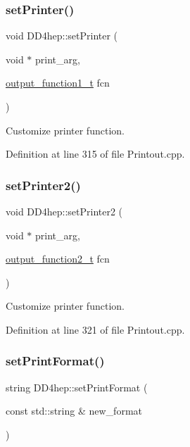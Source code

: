 \subsubsection{\texorpdfstring{set\+Printer()}{setPrinter()}}
{\footnotesize\ttfamily void D\+D4hep\+::set\+Printer (\begin{DoxyParamCaption}\item[{void $\ast$}]{print\+\_\+arg,  }\item[{\hyperlink{namespace_d_d4hep_ae0b064bdf91daefc2e45293797f6780b}{output\+\_\+function1\+\_\+t}}]{fcn }\end{DoxyParamCaption})}



Customize printer function. 



Definition at line 315 of file Printout.\+cpp.

\hypertarget{namespace_d_d4hep_a5109e91adaa5c7b3de87e2f53291ff64}{}\label{namespace_d_d4hep_a5109e91adaa5c7b3de87e2f53291ff64} 
\subsubsection{\texorpdfstring{set\+Printer2()}{setPrinter2()}}
{\footnotesize\ttfamily void D\+D4hep\+::set\+Printer2 (\begin{DoxyParamCaption}\item[{void $\ast$}]{print\+\_\+arg,  }\item[{\hyperlink{namespace_d_d4hep_a932f25438e2e68169d1a82ff99301873}{output\+\_\+function2\+\_\+t}}]{fcn }\end{DoxyParamCaption})}



Customize printer function. 



Definition at line 321 of file Printout.\+cpp.

\hypertarget{namespace_d_d4hep_af513a6bf27ce12f7b69458e218bcdede}{}\label{namespace_d_d4hep_af513a6bf27ce12f7b69458e218bcdede} 
\subsubsection{\texorpdfstring{set\+Print\+Format()}{setPrintFormat()}}
{\footnotesize\ttfamily string D\+D4hep\+::set\+Print\+Format (\begin{DoxyParamCaption}\item[{const std\+::string \&}]{new\+\_\+format }\end{DoxyParamCaption})}



